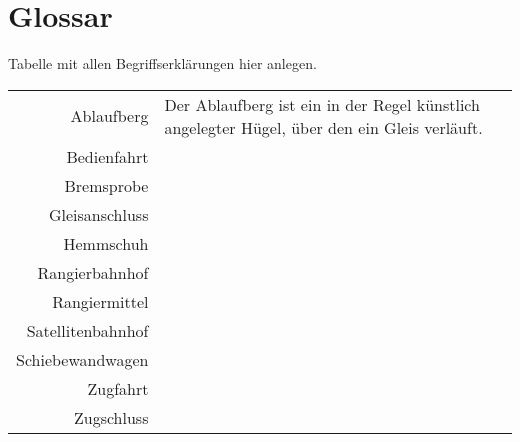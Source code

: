 \section{Glossar}
Tabelle mit allen Begriffserklärungen hier anlegen.\\
\begin{tabular}[c]{r|p{12cm}l}
	\hline
	Ablaufberg			&	Der Ablaufberg ist ein in der Regel künstlich angelegter Hügel, über den ein Gleis verläuft.		\\
	
	Bedienfahrt			&		\\
	Bremsprobe			&		\\
	
	Gleisanschluss		&		\\
	
	Hemmschuh			&		\\
	
	Rangierbahnhof		&		\\
	Rangiermittel		&		\\
	
	Satellitenbahnhof	&		\\
	Schiebewandwagen	&		\\
	
	Zugfahrt			&		\\
	Zugschluss			&		\\
	
	\hline
\end{tabular}